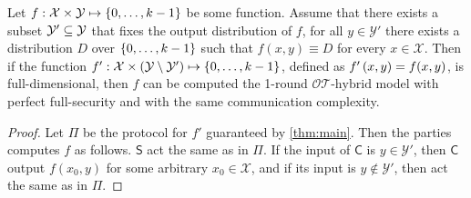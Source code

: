 \documentclass{llncs}
\newcommand{\OTfunc}{\mathcal{OT}}
\newcommand{\OThybrid}{\OTfunc\mbox{-}\text{hybrid}}
\newcommand{\X}{\mathcal{X}}
\newcommand{\Y}{\mathcal{Y}}
\renewcommand{\Z}{\set{0,\ldots,k-1}}
\renewcommand{\Sc}{\mathsf{S}}
\newcommand{\Cc}{\mathsf{C}}
\begin{document}
\begin{corollary}\label{cor:main}
Let $f:\X\times\Y\mapsto\Z$ be some function. Assume that there exists a subset $\Y'\su\Y$ that fixes the output distribution of $f$, \ie for all $y\in\Y'$ there exists a distribution $D$ over $\Z$ such that $f(x,y)\equiv D$ for every $x\in\X$. Then if the function $f':\X\times(\Y\setminus\Y')\mapsto\Z$, defined as $f'\left ( x,y \right )=f(x,y)$, is full-dimensional, then $f$ can be computed the 1-round $\OThybrid$ model with perfect full-security and with the same communication complexity.
\end{corollary}
\ifdefined\IsFV
\begin{proof}
Let $\Pi$ be the protocol for $f'$ guaranteed by \cref{thm:main}. Then the parties computes $f$ as follows. $\Sc$ act the same as in $\Pi$. If the input of $\Cc$ is $y\in\Y'$, then $\Cc$ output $f(x_0,y)$ for some arbitrary $x_0\in\X$, and if its input is $y\notin\Y'$, then act the same as in $\Pi$.
\end{proof}
\else\fi
\end{document}
